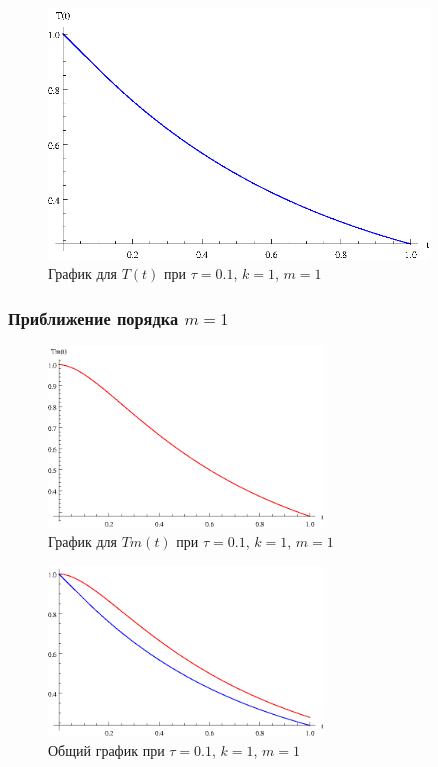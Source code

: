 \vfill

\begin{figure}[h]
\begin{center}
\includegraphics[width=0.9\textwidth]{./3_results/1_1.eps}
\end{center}
\caption{График для $T(t)$ при $\tau=0.1$, $k=1$, $m=1$}
\end{figure}

\vfill

\newpage

\subsubsection{Приближение порядка $m=1$}

\begin{figure}[h]
\begin{center}
\includegraphics[width=0.65\textwidth]{./3_results/1_2.eps}
\end{center}
\caption{График для $Tm(t)$ при $\tau=0.1$, $k=1$, $m=1$}
\end{figure}

\begin{figure}[h]
\begin{center}
\includegraphics[width=0.65\textwidth]{./3_results/1_3.eps}
\end{center}
\caption{Общий график при $\tau=0.1$, $k=1$, $m=1$}
\end{figure}